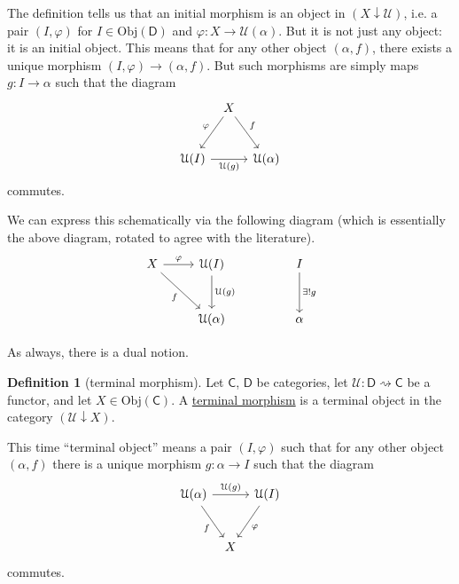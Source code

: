 \documentclass[a4paper]{report}
\newcommand{\defn}[1]{\ul{#1}}
\newcommand{\Obj}{\mathrm{Obj}}
\theoremstyle{definition}
\newtheorem{definition}{Definition}[section]
\theoremstyle{plain}
\theoremstyle{remark}
\begin{document}
The definition tells us that an initial morphism is an object in $(X \downarrow \mathcal{U})$, i.e. a pair $(I, \varphi)$ for $I \in \Obj(\mathsf{D})$ and $\varphi\colon X \to \mathcal{U}(\alpha)$. But it is not just any object: it is an initial object. This means that for any other object $(\alpha, f)$, there exists a unique morphism $(I, \varphi) \to (\alpha, f)$.
But such morphisms are simply maps $g\colon I \to \alpha$ such that the diagram
\begin{equation*}
  \begin{tikzcd}[column sep=tiny, row sep=6ex]
    & X \arrow[dl, swap, "\varphi"] \arrow[dr, "f"] & \\
    \mathcal{U}(I) \arrow[rr, swap, "\mathcal{U}(g)"] & & \mathcal{U}(\alpha)
  \end{tikzcd}
\end{equation*}
commutes.

We can express this schematically via the following diagram (which is essentially the above diagram, rotated to agree with the literature).
\begin{equation*}
  \begin{tikzcd}[row sep=large]
    X \arrow[r, "\varphi"] \arrow[dr, swap, "f"] & \mathcal{U}(I) \arrow[d, "\mathcal{U}(g)"] & & I \arrow[d, "\exists!g"]\\
    & \mathcal{U}(\alpha) & & \alpha
  \end{tikzcd}
\end{equation*}

As always, there is a dual notion.
\begin{definition}[terminal morphism]
  \label{def:terminalmorphism}
  Let $\mathsf{C}$, $\mathsf{D}$ be categories, let $\mathcal{U}\colon \mathsf{D} \rightsquigarrow \mathsf{C}$ be a functor, and let $X \in \Obj(\mathsf{C})$. A \defn{terminal morphism} is a terminal object in the category $(\mathcal{U} \downarrow X)$.
\end{definition}

This time ``terminal object'' means a pair $(I, \varphi)$ such that for any other object $(\alpha, f)$ there is a unique morphism $g\colon \alpha \to I$ such that the diagram
\begin{equation*}
  \begin{tikzcd}[column sep=tiny, row sep=6ex]
    \mathcal{U}(\alpha) \arrow[dr, swap, "f"] \arrow[rr, "\mathcal{U}(g)"] & & \mathcal{U}(I)\arrow[dl, "\varphi"] \\
    & X 
  \end{tikzcd}
\end{equation*}
commutes.
\end{document}
